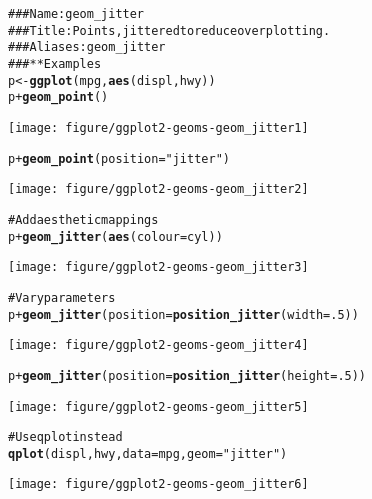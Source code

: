 \documentclass[a4paper,titlepage]{tufte-handout}\usepackage{graphicx, color}
\makeatletter
\def\maxwidth{ %
  \ifdim\Gin@nat@width>\linewidth
    \linewidth
  \else
    \Gin@nat@width
  \fi
}
\newcommand{\hlfunctioncall}[1]{\textcolor[rgb]{0.501960784313725,0,0.329411764705882}{\textbf{#1}}}%
\newcommand{\hlstring}[1]{\textcolor[rgb]{0.6,0.6,1}{#1}}%
\newcommand{\hlcomment}[1]{\textcolor[rgb]{0.180392156862745,0.6,0.341176470588235}{#1}}%
\newenvironment{kframe}{%
 \def\at@end@of@kframe{}%
 \ifinner\ifhmode%
  \def\at@end@of@kframe{\end{minipage}}%
  \begin{minipage}{\columnwidth}%
 \fi\fi%
 \def\FrameCommand##1{\hskip\@totalleftmargin \hskip-\fboxsep
 \colorbox{shadecolor}{##1}\hskip-\fboxsep
     \hskip-\linewidth \hskip-\@totalleftmargin \hskip\columnwidth}%
 \MakeFramed {\advance\hsize-\width
   \@totalleftmargin\z@ \linewidth\hsize
   \@setminipage}}%
 {\par\unskip\endMakeFramed%
 \at@end@of@kframe}
\newenvironment{knitrout}{}{} %
\makeatother
\begin{document}
\begin{knitrout}
\color{fgcolor}\begin{kframe}
\begin{alltt}
\hlcomment{### Name: geom_jitter}
\hlcomment{### Title: Points, jittered to reduce overplotting.}
\hlcomment{### Aliases: geom_jitter}
\hlcomment{### ** Examples}
p <- \hlfunctioncall{ggplot}(mpg, \hlfunctioncall{aes}(displ, hwy))
p + \hlfunctioncall{geom_point}()
\end{alltt}
\end{kframe}\texttt{[image: figure/ggplot2-geoms-geom\_jitter1]} \begin{kframe}\begin{alltt}
p + \hlfunctioncall{geom_point}(position = \hlstring{"jitter"})
\end{alltt}
\end{kframe}\texttt{[image: figure/ggplot2-geoms-geom\_jitter2]} \begin{kframe}\begin{alltt}
\hlcomment{# Add aesthetic mappings}
p + \hlfunctioncall{geom_jitter}(\hlfunctioncall{aes}(colour = cyl))
\end{alltt}
\end{kframe}\texttt{[image: figure/ggplot2-geoms-geom\_jitter3]} \begin{kframe}\begin{alltt}
\hlcomment{# Vary parameters}
p + \hlfunctioncall{geom_jitter}(position = \hlfunctioncall{position_jitter}(width = .5))
\end{alltt}
\end{kframe}\texttt{[image: figure/ggplot2-geoms-geom\_jitter4]} \begin{kframe}\begin{alltt}
p + \hlfunctioncall{geom_jitter}(position = \hlfunctioncall{position_jitter}(height = .5))
\end{alltt}
\end{kframe}\texttt{[image: figure/ggplot2-geoms-geom\_jitter5]} \begin{kframe}\begin{alltt}
\hlcomment{# Use qplot instead}
\hlfunctioncall{qplot}(displ, hwy, data = mpg, geom = \hlstring{"jitter"})
\end{alltt}
\end{kframe}\texttt{[image: figure/ggplot2-geoms-geom\_jitter6]} \begin{kframe}\begin{alltt}

\end{alltt}
\end{kframe}
\end{knitrout}
\end{document}
